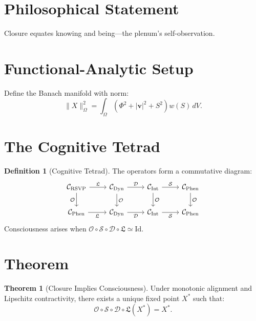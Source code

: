 \documentclass[12pt]{book}
\theoremstyle{definition}
\newtheorem{definition}{Definition}[chapter]
\newtheorem{theorem}{Theorem}[chapter]
\begin{document}
\section{Philosophical Statement}
Closure equates knowing and being—the plenum’s self-observation.

\section{Functional-Analytic Setup}
Define the Banach manifold with norm:
\begin{equation}
\|X\|_\Omega^2 = \int_\Omega (\Phi^2 + |\mathbf{v}|^2 + S^2) w(S) \, dV.
\end{equation}

\section{The Cognitive Tetrad}
\begin{definition}[Cognitive Tetrad]
\label{def:cognitive_tetrad}
The operators form a commutative diagram:
\begin{equation}
\begin{tikzcd}
\mathcal{C}_{\text{RSVP}} \arrow[r, "\mathfrak{L}"] \arrow[d, "\mathcal{O}"'] & 
\mathcal{C}_{\text{Dyn}} \arrow[r, "\mathcal{D}"] \arrow[d, "\mathcal{O}"] &
\mathcal{C}_{\text{Int}} \arrow[r, "\mathcal{S}"] \arrow[d, "\mathcal{O}"] &
\mathcal{C}_{\text{Phen}} \arrow[d, "\mathcal{O}"] \\
\mathcal{C}_{\text{Phen}} \arrow[r, "\mathfrak{L}"'] &
\mathcal{C}_{\text{Dyn}} \arrow[r, "\mathcal{D}"'] &
\mathcal{C}_{\text{Int}} \arrow[r, "\mathcal{S}"'] &
\mathcal{C}_{\text{Phen}}
\end{tikzcd}
\end{equation}
Consciousness arises when $\mathcal{O} \circ \mathcal{S} \circ \mathcal{D} \circ \mathfrak{L} \simeq \text{Id}$.
\end{definition}

\section{Theorem}
\begin{theorem}[Closure Implies Consciousness]
\label{thm:closure}
Under monotonic alignment and Lipschitz contractivity, there exists a unique fixed point $X^*$ such that:
\begin{equation}
\mathcal{O} \circ \mathcal{S} \circ \mathcal{D} \circ \mathfrak{L}(X^*) = X^*.
\end{equation}
\end{theorem}
\end{document}
